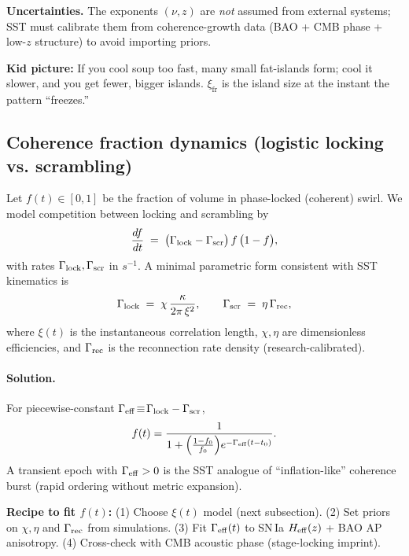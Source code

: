 \documentclass[10pt,reprint,aps,onecolumn,nofootinbib]{revtex4-2}
\begin{document}
        \begin{edgebox}
        \textbf{Uncertainties.} The exponents \((\nu,z)\) are \emph{not} assumed from external systems; SST must calibrate them from coherence-growth data (BAO + CMB phase + low-\(z\) structure) to avoid importing priors.
        \end{edgebox}

        \begin{analogynote}
        \textbf{Kid picture:} If you cool soup too fast, many small fat-islands form; cool it slower, and you get fewer, bigger islands. \(\xi_{\mathrm{fr}}\) is the island size at the instant the pattern ``freezes.''
        \end{analogynote}

\subsection*{Coherence fraction dynamics (logistic locking vs. scrambling)}
Let \(f(t)\in[0,1]\) be the fraction of volume in phase-locked (coherent) swirl.
We model competition between locking and scrambling by
\begin{equation}
\frac{df}{dt} \;=\; \big(\Gamma_{\rm lock}-\Gamma_{\rm scr}\big)\, f\,\big(1-f\big),
\label{eq:logistic}
\end{equation}
with rates \(\Gamma_{\rm lock},\Gamma_{\rm scr}\) in \(\si{s^{-1}}\).
A minimal parametric form consistent with SST kinematics is
\[
    \Gamma_{\rm lock} \;=\; \chi\,\frac{\kappa}{2\pi\,\xi^2},
    \qquad
    \Gamma_{\rm scr} \;=\; \eta\,\Gamma_{\rm rec},
\]
where \(\xi(t)\) is the instantaneous correlation length, \(\chi,\eta\) are dimensionless efficiencies, and \(\Gamma_{\rm rec}\) is the reconnection rate density (research-calibrated).
\paragraph*{Solution.} For piecewise-constant \(\Gamma_{\rm eff}\!\equiv\!\Gamma_{\rm lock}-\Gamma_{\rm scr}\),
    \[
        f(t)=\frac{1}{1+\Big(\frac{1-f_0}{f_0}\Big)e^{-\Gamma_{\rm eff}(t-t_0)}}.
    \]
    A transient epoch with \(\Gamma_{\rm eff}>0\) is the SST analogue of ``inflation-like'' coherence burst (rapid ordering without metric expansion).

    \begin{algobox}
    \textbf{Recipe to fit \(f(t)\):}
    (1) Choose \(\xi(t)\) model (next subsection).
    (2) Set priors on \(\chi,\eta\) and \(\Gamma_{\rm rec}\) from simulations.
    (3) Fit \(\Gamma_{\rm eff}(t)\) to SN\,Ia \(H_{\rm eff}(z)\) + BAO AP anisotropy.
    (4) Cross-check with CMB acoustic phase (stage-locking imprint).
    \end{algobox}
\end{document}
